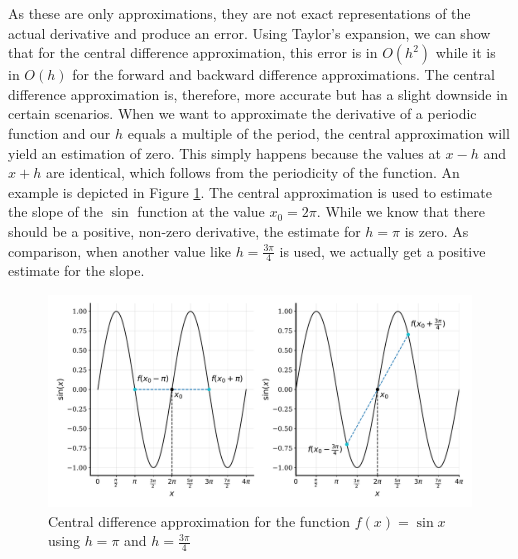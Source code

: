 As these are only approximations, they are not exact representations of the actual derivative and produce an error. Using Taylor's expansion, we can show that for the central difference approximation, this error is in $O(h^2)$ while it is in $O(h)$ for the forward and backward difference approximations. The central difference approximation is, therefore, more accurate but has a slight downside in certain scenarios. When we want to approximate the derivative of a periodic function and our $h$ equals a multiple of the period, the central approximation will yield an estimation of zero. This simply happens because the values at $x-h$ and $x + h$ are identical, which follows from the periodicity of the function. An example is depicted in Figure \ref{fig:central_periodic}. The central approximation is used to estimate the slope of the $\sin$ function at the value $x_0 = 2\pi$. While we know that there should be a positive, non-zero derivative, the estimate for $h = \pi$ is zero. As comparison, when another value like $h = \frac{3\pi}{4}$ is used, we actually get a positive estimate for the slope.

\begin{figure}
    \centering
    \includegraphics[width=\textwidth]{figures/central_periodic.pdf}
    \caption{Central difference approximation for the function $f(x) = \sin{x}$ using $h = \pi$ and $h = \frac{3 \pi}{4}$}
    \label{fig:central_periodic}
\end{figure}